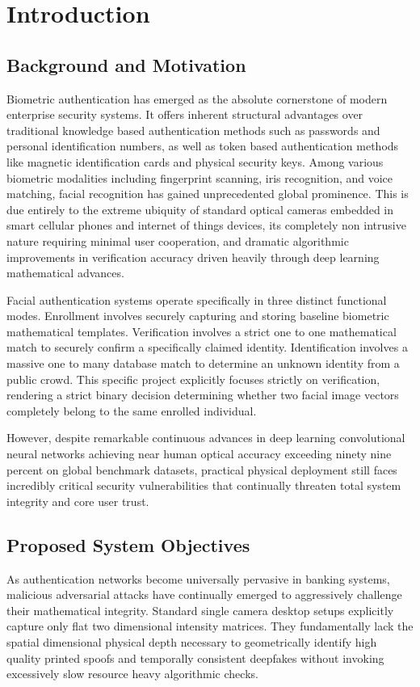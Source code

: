 \documentclass[12pt,a4paper]{report}
\begin{document}
\newpage
{}

\chapter{Introduction}
\section{Background and Motivation}
Biometric authentication has emerged as the absolute cornerstone of modern enterprise security systems. It offers inherent structural advantages over traditional knowledge based authentication methods such as passwords and personal identification numbers, as well as token based authentication methods like magnetic identification cards and physical security keys. Among various biometric modalities including fingerprint scanning, iris recognition, and voice matching, facial recognition has gained unprecedented global prominence. This is due entirely to the extreme ubiquity of standard optical cameras embedded in smart cellular phones and internet of things devices, its completely non intrusive nature requiring minimal user cooperation, and dramatic algorithmic improvements in verification accuracy driven heavily through deep learning mathematical advances.

Facial authentication systems operate specifically in three distinct functional modes. Enrollment involves securely capturing and storing baseline biometric mathematical templates. Verification involves a strict one to one mathematical match to securely confirm a specifically claimed identity. Identification involves a massive one to many database match to determine an unknown identity from a public crowd. This specific project explicitly focuses strictly on verification, rendering a strict binary decision determining whether two facial image vectors completely belong to the same enrolled individual.

However, despite remarkable continuous advances in deep learning convolutional neural networks achieving near human optical accuracy exceeding ninety nine percent on global benchmark datasets, practical physical deployment still faces incredibly critical security vulnerabilities that continually threaten total system integrity and core user trust. 

\section{Proposed System Objectives}
As authentication networks become universally pervasive in banking systems, malicious adversarial attacks have continually emerged to aggressively challenge their mathematical integrity. Standard single camera desktop setups explicitly capture only flat two dimensional intensity matrices. They fundamentally lack the spatial dimensional physical depth necessary to geometrically identify high quality printed spoofs and temporally consistent deepfakes without invoking excessively slow resource heavy algorithmic checks.
\end{document}
